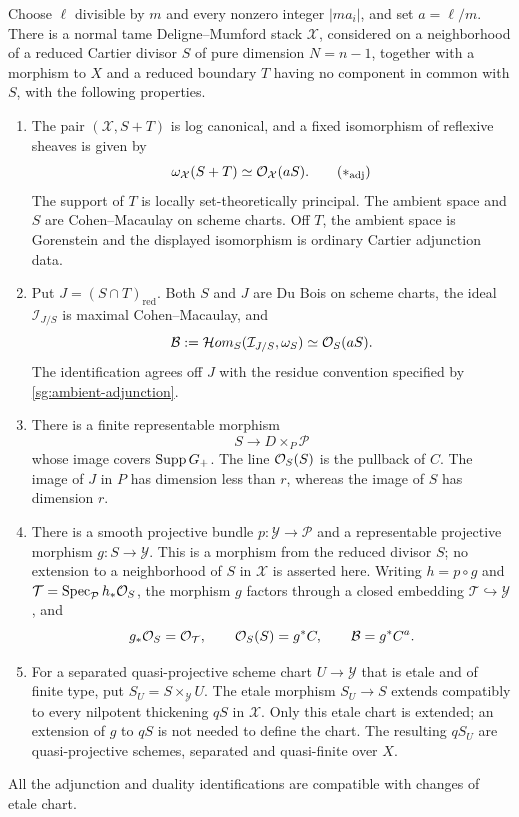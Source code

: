\begin{proposition}\label{prop:signed-construction}
Choose $\ell$ divisible by $m$ and every nonzero integer $|ma_i|$,
and set $a=\ell/m$.  There is a normal tame Deligne--Mumford stack
$\mathcal X$, considered on a neighborhood of a reduced Cartier
divisor $S$ of pure dimension $N=n-1$, together with a morphism
to $X$ and a reduced boundary
$T$ having no component in common with $S$, with the following
properties.
\begin{enumerate}[label=\textup{(\roman*)}]
\item
The pair $(\mathcal X,S+T)$ is log canonical, and a fixed
isomorphism of reflexive sheaves is given by
\[
 \omega_{\mathcal X}(S+T)\simeq\OO_{\mathcal X}(aS).
 \tag{\(\ast_{\mathrm{adj}}\)}\label{sg:ambient-adjunction}
\]
The support of $T$ is locally set-theoretically principal.
The ambient space and $S$ are Cohen--Macaulay on scheme charts.
Off $T$, the ambient space is Gorenstein and the displayed
isomorphism is ordinary Cartier adjunction data.

\item
Put $J=(S\cap T)_{\mathrm{red}}$.  Both $S$ and $J$ are Du Bois
on scheme charts, the ideal $\mathcal I_{J/S}$ is maximal
Cohen--Macaulay, and
\[
 \mathcal B:=
 \mathcal Hom_S(\mathcal I_{J/S},\omega_S)
 \simeq\mathcal{O}_S(aS).
\]
The identification agrees off $J$ with the residue convention
specified by \eqref{sg:ambient-adjunction}.

\item
There is a finite representable morphism
\[
 S\longrightarrow D\times_P\mathcal P
\]
whose image covers $\operatorname{Supp} G_+$.  The line $\mathcal{O}_S(S)$ is the pullback
of $C$.  The image of $J$ in $P$ has dimension less than $r$,
whereas the image of $S$ has dimension $r$.

\item
There is a smooth projective bundle $p:\mathcal Y\to\mathcal P$
and a representable projective morphism $g:S\to\mathcal Y$.
This is a morphism from the reduced divisor $S$; no extension
to a neighborhood of $S$ in $\mathcal X$ is asserted here.
Writing $h=p\circ g$ and
$\mathcal T=\operatorname{Spec}_{\mathcal P}h_*\mathcal{O}_S$, the morphism $g$ factors
through a closed embedding $\mathcal T\hookrightarrow\mathcal Y$,
and
\[
 g_*\mathcal{O}_S=\mathcal{O}_{\mathcal T},\qquad
 \mathcal{O}_S(S)=g^*C,\qquad \mathcal B=g^*C^a.
\]

\item
For a separated quasi-projective scheme chart
$U\to\mathcal Y$ that is etale and of finite type, put
$S_U=S\times_{\mathcal Y}U$.
The etale morphism $S_U\to S$ extends compatibly to every
nilpotent thickening $qS$ in $\mathcal X$.
Only this etale chart is extended; an extension of $g$ to $qS$
is not needed to define the chart.
The resulting $qS_U$ are quasi-projective schemes, separated
and quasi-finite over $X$.
\end{enumerate}
All the adjunction and duality identifications are compatible
with changes of etale chart.
\end{proposition}

